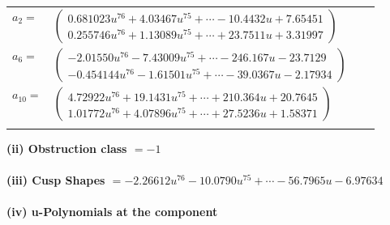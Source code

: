 \documentclass[1p]{elsarticle_modified}
\theoremstyle{definition}
\begin{document}
\begin{tabular}{m{7pt} m{180pt} m{7pt} m{180pt} }
\flushright $a_{2}=$&$\begin{pmatrix}0.681023 u^{76}+4.03467 u^{75}+\cdots-10.4432 u+7.65451\\0.255746 u^{76}+1.13089 u^{75}+\cdots+23.7511 u+3.31997\end{pmatrix}$ \\
\flushright $a_{6}=$&$\begin{pmatrix}-2.01550 u^{76}-7.43009 u^{75}+\cdots-246.167 u-23.7129\\-0.454144 u^{76}-1.61501 u^{75}+\cdots-39.0367 u-2.17934\end{pmatrix}$ \\
\flushright $a_{10}=$&$\begin{pmatrix}4.72922 u^{76}+19.1431 u^{75}+\cdots+210.364 u+20.7645\\1.01772 u^{76}+4.07896 u^{75}+\cdots+27.5236 u+1.58371\end{pmatrix}$\\&\end{tabular}
\flushleft \textbf{(ii) Obstruction class $= -1$}\\~\\
\flushleft \textbf{(iii) Cusp Shapes $= -2.26612 u^{76}-10.0790 u^{75}+\cdots-56.7965 u-6.97634$}\\~\\
\newpage\renewcommand{\arraystretch}{1}
\flushleft \textbf{(iv) u-Polynomials at the component}\newline \\
\end{document}
